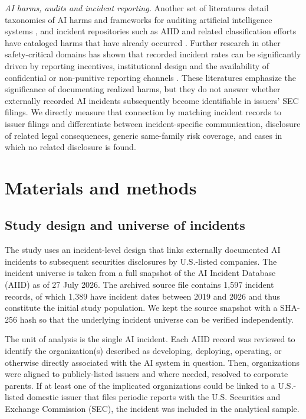 \documentclass[utf8]{FrontiersinHarvard}
\begin{document}
\textit{AI harms, audits and incident reporting.} Another set of literatures detail taxonomies of AI harms and frameworks for auditing artificial intelligence systems \citep{Weidinger2022,Raji2020,Bommasani2021,CostanzaChock2022}, and incident repositories such as AIID and related classification efforts have cataloged harms that have already occurred \citep{McGregor2021,OECD2024}. Further research in other safety-critical domains has shown that recorded incident rates can be significantly driven by reporting incentives, institutional design and the availability of confidential or non-punitive reporting channels \citep{Barach2000,Classen2011,Macrae2016}. These literatures emphasize the significance of documenting realized harms, but they do not answer whether externally recorded AI incidents subsequently become identifiable in issuers' SEC filings. We directly measure that connection by matching incident records to issuer filings and differentiate between incident-specific communication, disclosure of related legal consequences, generic same-family risk coverage, and cases in which no related disclosure is found.

\section{Materials and methods}

\subsection{Study design and universe of incidents}
The study uses an incident-level design that links externally documented AI incidents to subsequent securities disclosures by U.S.-listed companies. The incident universe is taken from a full snapshot of the AI Incident Database (AIID) as of 27 July 2026. The archived source file contains 1{,}597 incident records, of which 1{,}389 have incident dates between 2019 and 2026 and thus constitute the initial study population. We kept the source snapshot with a SHA-256 hash so that the underlying incident universe can be verified independently.

The unit of analysis is the single AI incident. Each AIID record was reviewed to identify the organization(s) described as developing, deploying, operating, or otherwise directly associated with the AI system in question. Then, organizations were aligned to publicly-listed issuers and where needed, resolved to corporate parents. If at least one of the implicated organizations could be linked to a U.S.-listed domestic issuer that files periodic reports with the U.S. Securities and Exchange Commission (SEC), the incident was included in the analytical sample.
\end{document}
